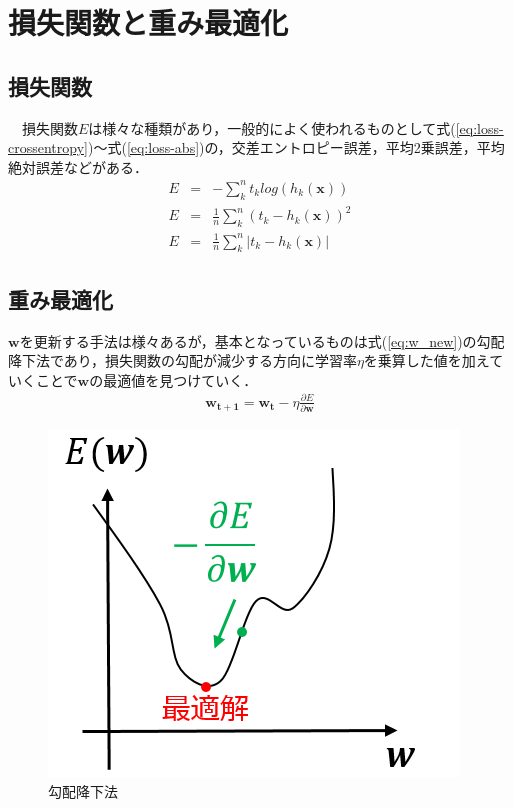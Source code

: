 \documentclass[a4j, 11pt]{jreport}
\newcommand{\eref}[1]{式(\ref{#1})}
\begin{document}
\section{損失関数と重み最適化}
\subsection{損失関数}
　損失関数$E$は様々な種類があり，一般的によく使われるものとして\eref{eq:loss-crossentropy}～\eref{eq:loss-abs}の，交差エントロピー誤差，平均2乗誤差，平均絶対誤差などがある．
　\begin{eqnarray}
	E &=& -\sum_{k}^{n} t_k log(h_{k}(\bm x)) \label{eq:loss-crossentropy}　\\
	E &=& \frac{1}{n}\sum_{k}^{n}{( t_k - h_{k}(\bm x) )^2} \\
	E &=& \frac{1}{n}\sum_{k}^{n}| t_k - h_{k}(\bm x) | \label{eq:loss-abs}
\end{eqnarray}

\subsection{重み最適化}
$\bm{w}$を更新する手法は様々あるが，基本となっているものは\eref{eq:w_new}の勾配降下法であり，損失関数の勾配が減少する方向に学習率$\eta$を乗算した値を加えていくことで$\bm{w}$の最適値を見つけていく．
\begin{eqnarray}
	\label{eq:w_new}
	\bm{w_{t+1}} = \bm{w_{t}} - \eta \frac{\partial E}{\partial \bm{w}}
\end{eqnarray}
\begin{figure}[htbp]
	\begin{center}
		\includegraphics[scale=1]{./images/deeplearning/sgd.png}
		\caption{勾配降下法}
		\label{fig:sgd}
	\end{center}
\end{figure}
\end{document}
